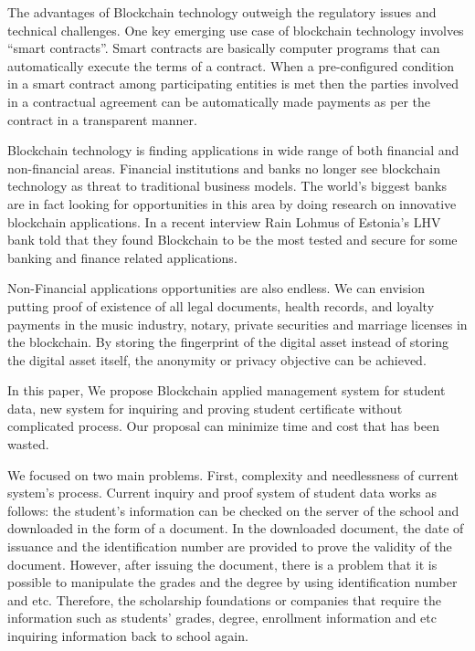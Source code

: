\documentclass[conference]{IEEEtran}
\begin{document}
The advantages of Blockchain technology outweigh the regulatory issues and technical challenges. One
key emerging use case of blockchain technology involves “smart contracts”. Smart contracts are
basically computer programs that can automatically execute the terms of a contract. When a
pre-configured condition in a smart contract among participating entities is met then the parties
involved in a contractual agreement can be automatically made payments as per the contract in a
transparent manner.

Blockchain technology is finding applications in wide range of both financial and non-financial areas. Financial institutions and banks no longer see blockchain technology as threat to traditional business models. The world’s biggest banks are in fact looking for opportunities in this area by doing research on innovative blockchain applications. In a recent interview Rain Lohmus of Estonia’s LHV bank told that they found Blockchain to be the most tested and secure for some banking and finance related applications. 

Non-Financial applications opportunities are also endless. We can envision putting proof of existence of all legal documents, health records, and loyalty payments in the music industry, notary, private securities and marriage licenses in the blockchain. By storing the fingerprint of the digital asset instead of storing the digital asset itself, the anonymity or privacy objective can be achieved.

In this paper, We propose Blockchain applied management system for student data, new system for inquiring and proving student certificate without complicated process. Our proposal can minimize time and cost that has been wasted.

We focused on two main problems. First, complexity and needlessness of current system's process. Current inquiry and proof system of student data works as follows: the student's information can be checked on the server of the school and downloaded in the form of a document. In the downloaded document, the date of issuance and the identification number are provided to prove the validity of the document. However, after issuing the document, there is a problem that it is possible to manipulate the grades and the degree by using identification number and etc. Therefore, the scholarship foundations or companies that require the information such as students' grades, degree, enrollment information and etc inquiring information back to school again. 
\end{document}
